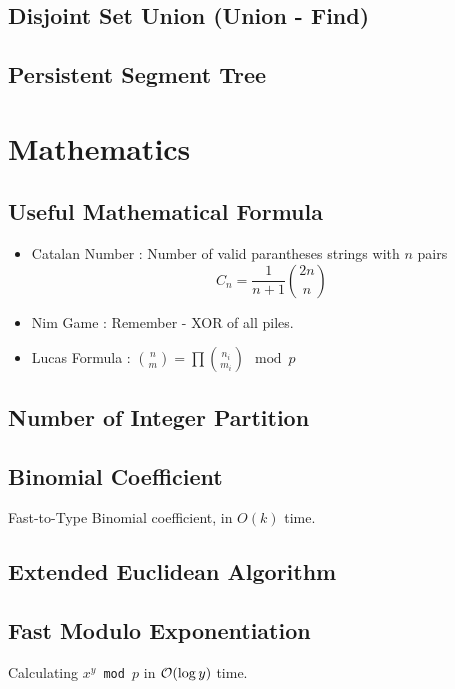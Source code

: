 \documentclass[landscape,8pt]{article}
\begin{document}
\begin{multicols}{2}
  \subsection{Disjoint Set Union (Union - Find)}
    
  \subsection{Persistent Segment Tree}
\columnbreak
\section{Mathematics}
  \subsection{Useful Mathematical Formula}
    \begin{itemize}
      \item Catalan Number : Number of valid parantheses strings with $n$ pairs
      \[
        C_n = \frac{1}{n+1}\binom{2n}{n}
      \]
      \item Nim Game : Remember - XOR of all piles.
      \item Lucas Formula : $\binom{n}{m} = \prod \binom{n_i}{m_i} \mod p$
    \end{itemize}
  \subsection{Number of Integer Partition}
    

  \subsection{Binomial Coefficient}
    Fast-to-Type Binomial coefficient, in $O(k)$ time.
    

  \subsection{Extended Euclidean Algorithm}
    

  \subsection{Fast Modulo Exponentiation}
  Calculating \texttt{$x^y$ mod $p$} in $\order{\log y}$ time.
    


\end{multicols}
\end{document}
